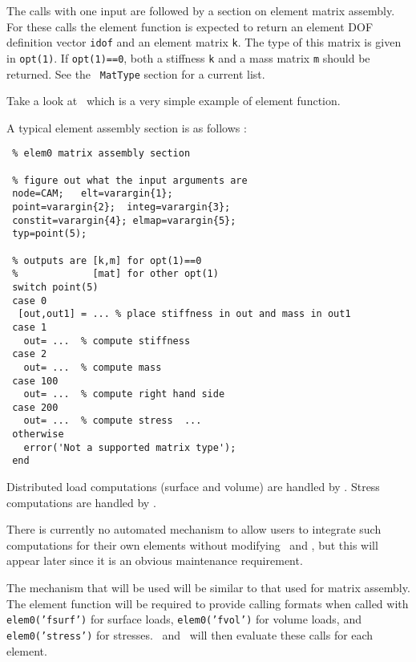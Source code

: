 The calls with one input are followed by a section on element matrix assembly. For these calls the element function is expected to return 
an element DOF definition vector {\tt idof} and an element matrix {\tt k}. The type of this matrix is given in {\tt opt(1)}.  If {\tt opt(1)==0}, both a stiffness {\tt k} and a mass matrix {\tt m} should be returned.  See the \femk\ {\tt MatType} section for a current list. 

Take a look at \bare\ which is a very simple example of element function.

A typical element assembly section is as follows :  

\begin{verbatim}
 % elem0 matrix assembly section

 % figure out what the input arguments are
 node=CAM;   elt=varargin{1}; 
 point=varargin{2};  integ=varargin{3};
 constit=varargin{4}; elmap=varargin{5};
 typ=point(5);
   
 % outputs are [k,m] for opt(1)==0
 %             [mat] for other opt(1)
 switch point(5)
 case 0
  [out,out1] = ... % place stiffness in out and mass in out1
 case 1
   out= ...  % compute stiffness
 case 2
   out= ...  % compute mass
 case 100 
   out= ...  % compute right hand side
 case 200 
   out= ...  % compute stress  ...
 otherwise
   error('Not a supported matrix type');
 end

\end{verbatim}

Distributed load computations (surface and volume) are handled by \feload. Stress computations are handled by \festress.

There is currently no automated mechanism to allow users to integrate such computations for their own elements without modifying \feload\ and \festress, but this will appear later since it is an obvious maintenance requirement.

The mechanism that will be used will be similar to that used for matrix assembly. The element function will be required to provide calling formats when called with {\tt elem0('fsurf')} for surface loads, {\tt elem0('fvol')} for volume loads, and \\ {\tt elem0('stress')} for stresses.  \feload\ and \festress\ will then evaluate these calls for each element.



